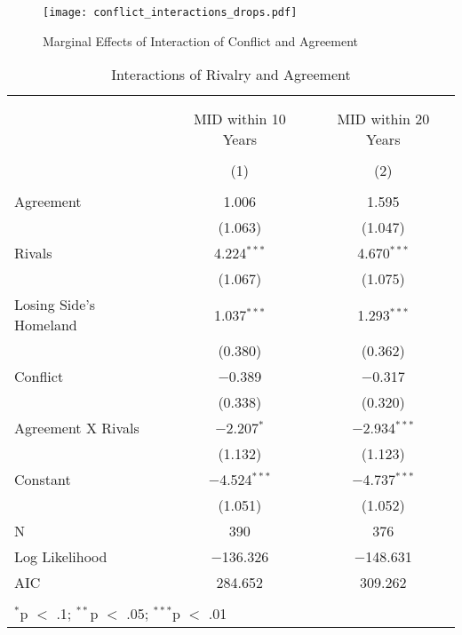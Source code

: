 \documentclass{article}
\begin{document}
\begin{figure}[h!]
\caption{Marginal Effects of Interaction of Conflict and Agreement}
\texttt{[image: conflict\_interactions\_drops.pdf]}
\end{figure}

\begin{table}[!htbp] \centering 
  \caption{Interactions of Rivalry and Agreement} 
  \label{} 
\begin{tabular}{@{\extracolsep{5pt}}lcc} 
\\[-1.8ex]\hline \\[-1.8ex] 
\\[-1.8ex] & MID within 10 Years & MID within 20 Years \\ 
\\[-1.8ex] & (1) & (2)\\ 
\hline \\[-1.8ex] 
 Agreement & 1.006 & 1.595 \\ 
  & (1.063) & (1.047) \\ 
  Rivals & 4.224$^{***}$ & 4.670$^{***}$ \\ 
  & (1.067) & (1.075) \\ 
  Losing Side's Homeland & 1.037$^{***}$ & 1.293$^{***}$ \\ 
  & (0.380) & (0.362) \\ 
  Conflict & $-$0.389 & $-$0.317 \\ 
  & (0.338) & (0.320) \\ 
  Agreement X Rivals & $-$2.207$^{*}$ & $-$2.934$^{***}$ \\ 
  & (1.132) & (1.123) \\ 
  Constant & $-$4.524$^{***}$ & $-$4.737$^{***}$ \\ 
  & (1.051) & (1.052) \\ 
 N & 390 & 376 \\ 
Log Likelihood & $-$136.326 & $-$148.631 \\ 
AIC & 284.652 & 309.262 \\ 
\hline \\[-1.8ex] 
\multicolumn{3}{l}{$^{*}$p $<$ .1; $^{**}$p $<$ .05; $^{***}$p $<$ .01} \\ 
\end{tabular} 
\end{table} 
\end{document}
